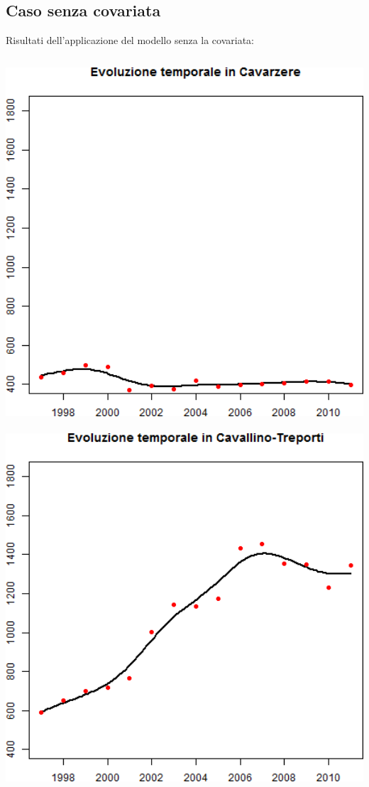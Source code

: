 \documentclass[landscape,9pt]{beamer}                           %
\begin{document}
\subsection{Caso senza covariata}
\begin{frame}
Risultati dell'applicazione del modello senza la covariata:
\newline
\begin{columns}
	\begin{column}{0.225\textwidth}
	\includegraphics[width=1\textwidth]{Immagini/Venezia/Cavarzere.png}
	\ \
	\newline
	\includegraphics[width=1\textwidth]{Immagini/Venezia/Cavallino-Treporti.png}

\end{column}
\end{columns}
\end{frame}
\end{document}
